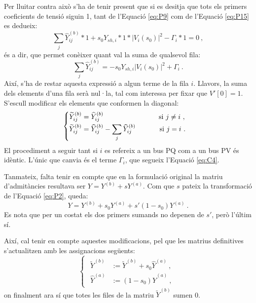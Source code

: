Per lluitar contra això s'ha de tenir present que si es desitja que tots els primers coeficients de tensió siguin 1, tant de l'Equació \ref{eq:P9} com de l'Equació \ref{eq:P15} es dedueix:
\begin{equation}
    \sum_{j}\widehat{Y}^{(b)}_{ij}*1+s_0Y_{sh,i}*1*|V_i(s_0)|^2-\Gamma_i*1=0\ ,
    \label{eq:C6}
\end{equation}
és a dir, que permet conèixer quant val la suma de qualsevol fila:
\begin{equation}
    \sum_{j}\widehat{Y}^{(b)}_{ij}=-s_0Y_{sh,i}|V_i(s_0)|^2+\Gamma_i\ .
    \label{eq:C7}
\end{equation}
Així, s'ha de restar aquesta expressió a algun terme de la fila $i$. Llavors, la suma dels elements d'una fila serà nul·la, tal com interessa per fixar que $V'[0]=1$. S'escull modificar els elements que conformen la diagonal:
\begin{equation}
    \begin{cases}
    \begin{split}
        \widetilde{Y}^{(b)}_{ij}&= \widehat{Y}^{(b)}_{ij}\text{\hspace{77pt} si }j\neq i\ ,\\
        \widetilde{Y}^{(b)}_{ij}&= \widehat{Y}^{(b)}_{ij}-\sum_{j}\widehat{Y}^{(b)}_{ij}\text{\hspace{31.5pt} si }j=i\ .\\
    \end{split}
\end{cases}
    \label{eq:C8}
\end{equation}
El procediment a seguir tant si $i$ es refereix a un bus PQ com a un bus PV és idèntic. L'únic que canvia és el terme $\Gamma_i$, que segueix l'Equació \ref{eq:C4}.

Tanmateix, falta tenir en compte que en la formulació original la matriu d'admitàncies resultava ser $Y=Y^{(b)}+sY^{(a)}$. Com que $s$ pateix la transformació de l'Equació \ref{eq:P2}, queda:
\begin{equation}
    Y=Y^{(b)}+s_0Y^{(a)}+s'(1-s_0)Y^{(a)}\ .
    \label{eq:sy5}
\end{equation}
Es nota que per un costat els dos primers sumands no depenen de $s'$, però l'últim sí. 

Així, cal tenir en compte aquestes modificacions, pel que les matrius definitives s'actualitzen amb les assignacions següents:
\begin{equation}
    \begin{cases}
    \begin{split}
    \widetilde{Y}^{(b)}&:= \widetilde{Y}^{(b)}+s_0\widehat{Y}^{(a)}\ ,\\
    \widehat{Y}^{(a)}&:= (1-s_0)\widehat{Y}^{(a)}\ ,
    \end{split}
\end{cases}
    \label{eq:sy6}
\end{equation}
on finalment ara sí que totes les files de la matriu $\widetilde{Y}^{(b)}$ sumen 0. 

